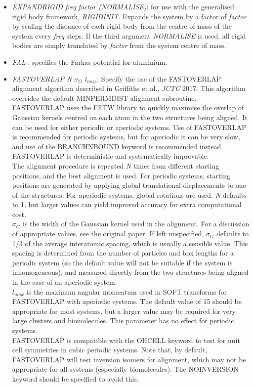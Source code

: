\documentclass[12pt,a4paper,dvips]{article}
\begin{document}
\begin{itemize}
\item {\it EXPANDRIGID freq factor (NORMALISE)}: for use with the generalised rigid body framework, 
{\it RIGIDINIT}. Expands the system by a factor of {\it factor} by scaling the distance
of each rigid body from the centre of mass of the system every {\it freq} steps. If the third argument {\it NORMALISE}
is used, all rigid bodies are simply translated by {\it factor} from the system centre of mass.


\item {\it FAL \/}: specifies the Farkas potential for aluminium.

\item {\it FASTOVERLAP N $\sigma_G$ $l_{max}$}: Specify the use of the FASTOVERLAP alignment algorithm described in Griffiths et al., {\it JCTC} 2017. This algorithm overrides the default MINPERMDIST alignment subroutine. FASTOVERLAP uses the FFTW library to quickly maximise the overlap of Gaussian kernels centred on each atom in the two structures being aligned. It can be used for either periodic or aperiodic systems. Use of FASTOVERLAP is recommended for periodic systems, but for aperiodic it can be very slow, and use of the BRANCHNBOUND keyword is recommended instead. FASTOVERLAP is deterministic and systematically improvable. \\
The alignment procedure is repeated {\it N} times from different starting positions, and the best alignment is used. For periodic systems, starting positions are generated by applying global translational displacements to one of the structures. For aperiodic systems, global rotations are used. {\it N} defaults to 1, but larger values can yield improved accuracy for extra computational cost. \\
{\it $\sigma_G$} is the width of the Gaussian kernel used in the alignment. For a discussion of appropriate values, see the original paper. If left unspecified, {\it $\sigma_G$} defaults to 1/3 of the average interatomic spacing, which is usually a sensible value. This spacing is determined from the number of particles and box lengths for a periodic system (so the default value will not be suitable if the system is inhomogeneous), and measured directly from the two structures being aligned in the case of an aperiodic system. \\
{\it $l_{max}$} is the maximum angular momentum used in SOFT transforms for FASTOVERLAP with aperiodic systems. The default value of 15 should be appropriate for most systems, but a larger value may be required for very large clusters and biomolecules. This parameter has no effect for periodic systems.\\
FASTOVERLAP is compatible with the OHCELL keyword to test for unit cell symmetries in cubic periodic systems. Note that, by default, FASTOVERLAP will test inversion isomers for alignment, which may not be appropriate for all systems (especially biomolecules). The NOINVERSION keyword should be specified to avoid this.


\end{itemize}
\end{document}
